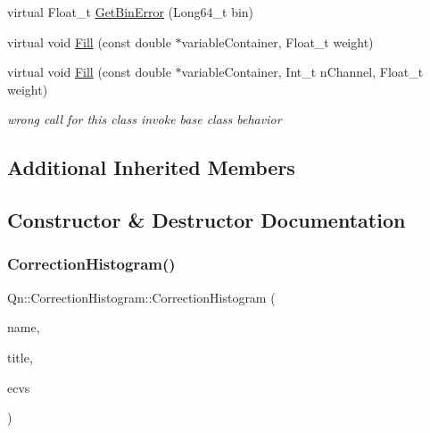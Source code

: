 \begin{DoxyCompactItemize}
\item 
virtual Float\+\_\+t \mbox{\hyperlink{classQn_1_1CorrectionHistogram_ac9feeeb4721f0b199c5c96e41224836e}{Get\+Bin\+Error}} (Long64\+\_\+t bin)
\item 
virtual void \mbox{\hyperlink{classQn_1_1CorrectionHistogram_a3704882797e987dc62c31d953f49ec7e}{Fill}} (const double $\ast$variable\+Container, Float\+\_\+t weight)
\item 
\mbox{\label{classQn_1_1CorrectionHistogram_a5686f074e8b72ce0faae1c266d1eee9f}} 
virtual void \mbox{\hyperlink{classQn_1_1CorrectionHistogram_a5686f074e8b72ce0faae1c266d1eee9f}{Fill}} (const double $\ast$variable\+Container, Int\+\_\+t n\+Channel, Float\+\_\+t weight)
\begin{DoxyCompactList}\small\item\em wrong call for this class invoke base class behavior \end{DoxyCompactList}\end{DoxyCompactItemize}
\subsection*{Additional Inherited Members}


\subsection{Constructor \& Destructor Documentation}
\mbox{\label{classQn_1_1CorrectionHistogram_acefd77dc11928421955bd2c8550ff817}} 
\subsubsection{\texorpdfstring{Correction\+Histogram()}{CorrectionHistogram()}}
{\footnotesize\ttfamily Qn\+::\+Correction\+Histogram\+::\+Correction\+Histogram (\begin{DoxyParamCaption}\item[{const char $\ast$}]{name,  }\item[{const char $\ast$}]{title,  }\item[{\mbox{\hyperlink{classQn_1_1EventClassVariablesSet}{Event\+Class\+Variables\+Set}} \&}]{ecvs }\end{DoxyParamCaption})}

